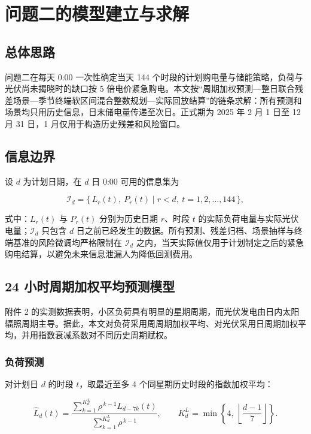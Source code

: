 \section{问题二的模型建立与求解}

\subsection{总体思路}

问题二在每天 0:00 一次性确定当天 144 个时段的计划购电量与储能策略，负荷与光伏尚未揭晓时的缺口按 5 倍电价紧急购电。本文按``周期加权预测—整日联合残差场景—季节终端软区间混合整数规划—实际回放结算''的链条求解：所有预测和场景均只用历史信息，日末储电量传递至次日。正式期为 2025 年 2 月 1 日至 12 月 31 日，1 月仅用于构造历史残差和风险窗口。

\subsection{信息边界}

设 $d$ 为计划日期，在 $d$ 日 0:00 可用的信息集为

\begin{equation}
  \mathcal{I}_d = \{\, L_r(t),\ P_r(t) \mid r < d,\ t = 1,2,\dots,144 \,\},
  \label{eq:infoset}
\end{equation}

式中：$L_r(t)$ 与 $P_r(t)$ 分别为历史日期 $r$、时段 $t$ 的实际负荷电量与实际光伏电量；$\mathcal{I}_d$ 只包含 $d$ 日之前已经发生的数据。所有预测、残差归档、场景抽样与终端基准的风险微调均严格限制在 $\mathcal{I}_d$ 之内，当天实际值仅用于计划制定之后的紧急购电结算，以避免未来信息泄漏人为降低回测费用。

\subsection{24 小时周期加权平均预测模型}

附件 2 的实测数据表明，小区负荷具有明显的星期周期，而光伏发电由日内太阳辐照周期主导。据此，本文对负荷采用周周期加权平均、对光伏采用日周期加权平均，并用指数衰减系数对不同历史周期赋权\cite{ref4}。

\subsubsection{负荷预测}

对计划日 $d$ 的时段 $t$，取最近至多 4 个同星期历史时段的指数加权平均：

\begin{equation}
  \widehat{L}_d(t) = \frac{\displaystyle\sum_{k=1}^{K^L_d} \rho^{\,k-1} L_{d-7k}(t)}{\displaystyle\sum_{k=1}^{K^L_d} \rho^{\,k-1}},
  \qquad
  K^L_d = \min\left\{4,\ \left\lfloor \frac{d-1}{7} \right\rfloor \right\}.
  \label{eq:loadpred}
\end{equation}

